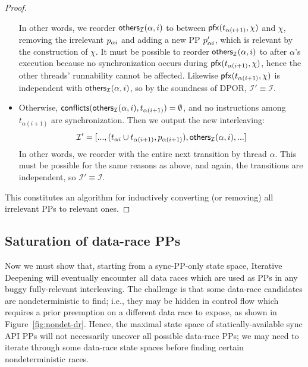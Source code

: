 \begin{proof}
\begin{itemize}
			In other words, we reorder $\mathsf{others}_{\mathcal{I}}(\alpha,i)$ to between $\mathsf{pfx}(t_{\alpha{}(i+1)},\chi)$ and $\chi$,
			removing the irrelevant $p_{\alpha{}i}$ and adding a new PP $p_{\alpha{}i}'$, which is relevant by the construction of $\chi$.
			It must be possible to reorder $\mathsf{others}_{\mathcal{I}}(\alpha,i)$ to after $\alpha$'s execution because no synchronization occurs during $\mathsf{pfx}(t_{\alpha{}(i+1)},\chi)$, hence the other threads' runnability cannot be affected.
			Likewise $\mathsf{pfx}(t_{\alpha{}(i+1)},\chi)$ is independent with $\mathsf{others}_{\mathcal{I}}(\alpha,i)$, so by the soundness of DPOR, $\mathcal{I}' \equiv \mathcal{I}$.
		\item Otherwise, $\mathsf{conflicts}(\mathsf{others}_{\mathcal{I}}(\alpha,i),t_{\alpha{}(i+1)}) = \emptyset$,
			and no instructions among $t_{\alpha{}(i+1)}$ are synchronization.
			Then we output the new interleaving:
			\[
				\mathcal{I}' = [..., (t_{\alpha{}i} \cup t_{\alpha(i+1)}, p_{\alpha(i+1)}), \mathsf{others}_{\mathcal{I}}(\alpha,i),...]
			\]
			In other words, we reorder {} with the entire next transition by thread $\alpha$.
			This must be possible for the same reasons as above, and again, the transitions are independent, so $\mathcal{I}' \equiv \mathcal{I}$.
	\end{itemize}
	This constitutes an algorithm for inductively converting (or removing) all irrelevant PPs to relevant ones.
\end{proof}


\subsection{Saturation of data-race PPs}

Now we must show that, starting from a sync-PP-only state space,
Iterative Deepening will eventually
encounter all data races which are used as PPs in any buggy fully-relevant interleaving.
The challenge
is that some data-race candidates are nondeterministic to find;
i.e., they may be hidden in
control flow which requires a prior preemption on a different data race to expose,
as shown in Figure~\ref{fig:nondet-dr}.
Hence, the maximal state space of statically-available sync API PPs will not necessarily uncover all possible data-race PPs;
we may need to iterate through some data-race state spaces before finding certain nondeterministic races.

